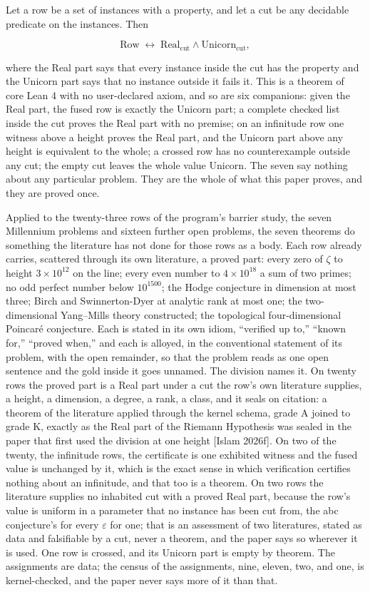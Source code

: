 \documentclass[10pt]{article}
\begin{document}
Let a row be a set of instances with a property, and let a cut be any
decidable predicate on the instances. Then

\[\mathrm{Row} \;\leftrightarrow\; \mathrm{Real}_{\mathrm{cut}} \wedge \mathrm{Unicorn}_{\mathrm{cut}},\]

where the Real part says that every instance inside the cut has the
property and the Unicorn part says that no instance outside it fails it.
This is a theorem of core Lean 4 with no user-declared axiom, and so are
six companions: given the Real part, the fused row is exactly the
Unicorn part; a complete checked list inside the cut proves the Real
part with no premise; on an infinitude row one witness above a height
proves the Real part, and the Unicorn part above any height is
equivalent to the whole; a crossed row has no counterexample outside any
cut; the empty cut leaves the whole value Unicorn. The seven say nothing
about any particular problem. They are the whole of what this paper
proves, and they are proved once.

Applied to the twenty-three rows of the program's barrier study, the
seven Millennium problems and sixteen further open problems, the seven
theorems do something the literature has not done for those rows as a
body. Each row already carries, scattered through its own literature, a
proved part: every zero of \(\zeta\) to height \(3 \times 10^{12}\) on
the line; every even number to \(4 \times 10^{18}\) a sum of two primes;
no odd perfect number below \(10^{1500}\); the Hodge conjecture in
dimension at most three; Birch and Swinnerton-Dyer at analytic rank at
most one; the two-dimensional Yang--Mills theory constructed; the
topological four-dimensional Poincaré conjecture. Each is stated in its
own idiom, ``verified up to,'' ``known for,'' ``proved when,'' and each
is alloyed, in the conventional statement of its problem, with the open
remainder, so that the problem reads as one open sentence and the gold
inside it goes unnamed. The division names it. On twenty rows the proved
part is a Real part under a cut the row's own literature supplies, a
height, a dimension, a degree, a rank, a class, and it seals on
citation: a theorem of the literature applied through the kernel schema,
grade A joined to grade K, exactly as the Real part of the Riemann
Hypothesis was sealed in the paper that first used the division at one
height {[}Islam 2026f{]}. On two of the twenty, the infinitude rows, the
certificate is one exhibited witness and the fused value is unchanged by
it, which is the exact sense in which verification certifies nothing
about an infinitude, and that too is a theorem. On two rows the
literature supplies no inhabited cut with a proved Real part, because
the row's value is uniform in a parameter that no instance has been cut
from, the abc conjecture's for every \(\varepsilon\) for one; that is an
assessment of two literatures, stated as data and falsifiable by a cut,
never a theorem, and the paper says so wherever it is used. One row is
crossed, and its Unicorn part is empty by theorem. The assignments are
data; the census of the assignments, nine, eleven, two, and one, is
kernel-checked, and the paper never says more of it than that.
\end{document}

